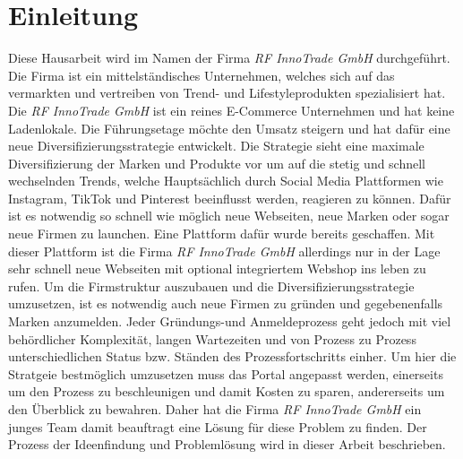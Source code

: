 \newpage

\section{Einleitung} \label{einleitung}
Diese Hausarbeit wird im Namen der Firma \textit{RF InnoTrade GmbH} durchgeführt. Die Firma ist ein mittelständisches Unternehmen, welches sich auf das vermarkten und vertreiben von Trend- und Lifestyleprodukten spezialisiert hat. Die \textit{RF InnoTrade GmbH} ist ein reines E-Commerce Unternehmen und hat keine Ladenlokale. Die Führungsetage möchte den Umsatz steigern und hat dafür eine neue Diversifizierungsstrategie entwickelt. Die Strategie sieht eine maximale Diversifizierung der Marken und Produkte vor um auf die stetig und schnell wechselnden Trends, welche Hauptsächlich durch Social Media Plattformen wie Instagram, TikTok und Pinterest beeinflusst werden, reagieren zu können. Dafür ist es notwendig so schnell wie möglich neue Webseiten, neue Marken oder sogar neue Firmen zu launchen.
Eine Plattform dafür wurde bereits geschaffen. Mit dieser Plattform ist die Firma \textit{RF InnoTrade GmbH} allerdings nur in der Lage sehr schnell neue Webseiten mit optional integriertem Webshop ins leben zu rufen. Um die Firmstruktur auszubauen und die Diversifizierungsstrategie umzusetzen, ist es notwendig auch neue Firmen zu gründen und gegebenenfalls Marken anzumelden. Jeder Gründungs-und Anmeldeprozess geht jedoch mit viel behördlicher Komplexität, langen Wartezeiten und von Prozess zu Prozess unterschiedlichen Status bzw. Ständen des Prozessfortschritts einher. Um hier die Stratgeie bestmöglich umzusetzen muss das Portal angepasst werden, einerseits um den Prozess zu beschleunigen und damit Kosten zu sparen, andererseits um den Überblick zu bewahren.
Daher hat die Firma \textit{RF InnoTrade GmbH} ein junges Team damit beauftragt eine Lösung für diese Problem zu finden. Der Prozess der Ideenfindung und Problemlösung wird in dieser Arbeit beschrieben.